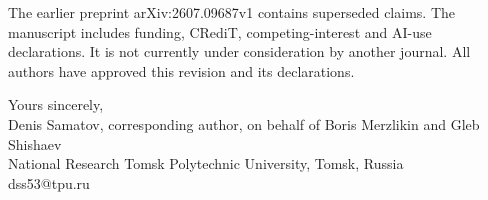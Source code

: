 \documentclass[11pt,a4paper]{article}
\begin{document}
The earlier preprint arXiv:2607.09687v1 contains superseded claims. The manuscript includes funding, CRediT, competing-interest and AI-use declarations. It is not currently under consideration by another journal. All authors have approved this revision and its declarations.

\medskip
Yours sincerely,\\
Denis Samatov, corresponding author, on behalf of Boris Merzlikin and Gleb Shishaev\\
National Research Tomsk Polytechnic University, Tomsk, Russia\\
dss53@tpu.ru
\end{document}
